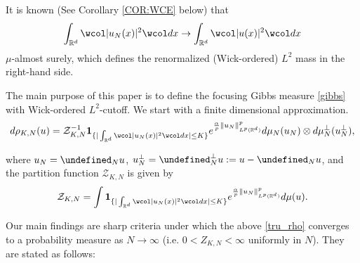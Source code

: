 \documentclass[%
11pt,  reqno]{amsart}
\theoremstyle{remarkstyle}
\newcommand{\1}{\hspace{0.2mm}\text{I}\hspace{0.2mm}}
\newcommand{\noi}{\noindent}
\newcommand{\R}{\mathbb{R}}
\let\P= \undefined
\newcommand{\P}{\mathbf{P}}
\newcommand{\al}{\alpha}
\newcommand{\wick}[1]{\wcol#1\wcol}
\newcommand{\ind}{\mathbf 1}
\numberwithin{equation}{section}
\numberwithin{theorem}{section}
\begin{document}
	\noi
	It is known (See Corollary \ref{COR:WCE} below) that 
	\begin{equation}\label{Wick bis}
		\int_{\R^d} \wick{|u_N (x)|^2} dx \to \int_{\R^d} \wick{|u (x)|^2} dx 
	\end{equation}
	$\mu$-almost surely, which defines the renormalized (Wick-ordered) $L^2$ mass in the right-hand side.
	
	
	The main purpose of this paper is to define the focusing
	Gibbs measure \eqref{gibbs}  with Wick-ordered $L^2$-cutoff.
	We start with a finite dimensional approximation.
	\begin{align}
		d \rho_{K,N} (u) =  \mathcal  Z_{K,N}^{-1} \ind_{ \{ | \int_{\R^d} \wick{| u_N (x)|^2} dx | \le K\}}  e^{\frac{\al}p{\| u_N \|_{L^p (\R^d)}^p}} d\mu_N (u_N)  \otimes d \mu_N^\perp (u_N^\perp),
		\label{tru_rho}
	\end{align} 
	
	\noi
	where $u_N = \P_{N} u$, $u_N^\perp = \P^\perp_N u := u - \P_{N} u$, and the partition function $\mathcal Z_{K,N}$ is given by
	\begin{align}
		\label{partition}
		\mathcal Z_{K,N} = \int \ind_{ \{ | \int_{\R^d} \wick{| u_N (x)|^2} dx | \le K\}}  e^{\frac{\al}p{\| u_N \|_{L^p (\R^d)}^p}} d\mu (u)  .
	\end{align}
	
	\noi
	Our main findings are sharp criteria under which the above \eqref{tru_rho} converges to a probability measure as $N \to \infty$ (i.e. $0 < Z_{K,N} < \infty$ uniformly in $N$). They are stated as follows:
	
\end{document}
